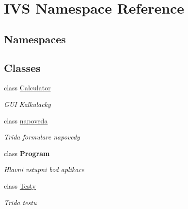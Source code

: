 \hypertarget{namespace_i_v_s}{}\section{I\+VS Namespace Reference}
\label{namespace_i_v_s}
\subsection*{Namespaces}
\begin{DoxyCompactItemize}
\end{DoxyCompactItemize}
\subsection*{Classes}
\begin{DoxyCompactItemize}
\item 
class \mbox{\hyperlink{class_i_v_s_1_1_calculator}{Calculator}}
\begin{DoxyCompactList}\small\item\em G\+UI Kalkulacky \end{DoxyCompactList}\item 
class \mbox{\hyperlink{class_i_v_s_1_1napoveda}{napoveda}}
\begin{DoxyCompactList}\small\item\em Trida formulare napovedy \end{DoxyCompactList}\item 
class {\bfseries Program}
\begin{DoxyCompactList}\small\item\em Hlavni vstupni bod aplikace \end{DoxyCompactList}\item 
class \mbox{\hyperlink{class_i_v_s_1_1_testy}{Testy}}
\begin{DoxyCompactList}\small\item\em Trida testu \end{DoxyCompactList}\end{DoxyCompactItemize}
